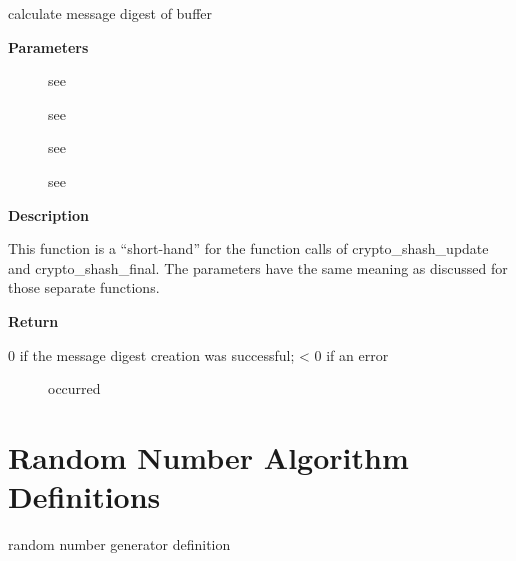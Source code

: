 \documentclass[a4paper,8pt,english]{sphinxmanual}
\begin{document}
\begin{fulllineitems}
\label{crypto/api-digest:c.crypto_shash_finup}
calculate message digest of buffer

\end{fulllineitems}


\textbf{Parameters}
\begin{description}
\item[{}] \leavevmode
see {\hyperref[crypto/api\string-digest:c.crypto_shash_final]{\emph{}}}

\item[{}] \leavevmode
see {\hyperref[crypto/api\string-digest:c.crypto_shash_update]{\emph{}}}

\item[{}] \leavevmode
see {\hyperref[crypto/api\string-digest:c.crypto_shash_update]{\emph{}}}

\item[{}] \leavevmode
see {\hyperref[crypto/api\string-digest:c.crypto_shash_final]{\emph{}}}

\end{description}

\textbf{Description}

This function is a ``short-hand'' for the function calls of
crypto\_shash\_update and crypto\_shash\_final. The parameters have the same
meaning as discussed for those separate functions.

\textbf{Return}
\begin{description}
\item[{0 if the message digest creation was successful; \textless{} 0 if an error}] \leavevmode
occurred

\end{description}


\section{Random Number Algorithm Definitions}
\label{crypto/api-rng::doc}\label{crypto/api-rng:random-number-algorithm-definitions}

\begin{fulllineitems}
\label{crypto/api-rng:c.rng_alg}
random number generator definition

\end{fulllineitems}
\end{document}
